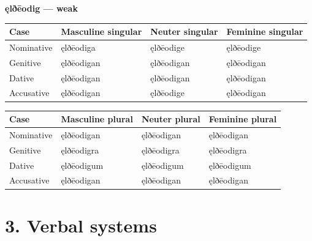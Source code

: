 \textbf{ęlðēodig — weak}

\par\begingroup
\fontsize{10.5}{13.2}\selectfont
\setlength{\LTleft}{0pt}\setlength{\LTright}{\fill}
\noindent
\begin{tabular}{@{}>{\raggedright\arraybackslash}p{22.0mm}>{\raggedright\arraybackslash}p{31.188mm}>{\raggedright\arraybackslash}p{31.188mm}>{\raggedright\arraybackslash}p{31.188mm}@{}}
\toprule
\textbf{Case} & \textbf{Masculine singular} & \textbf{Neuter singular} & \textbf{Feminine singular} \\
\midrule
Nominative & ęlðēodiga & ęlðēodige & ęlðēodige \\
Genitive & ęlðēodigan & ęlðēodigan & ęlðēodigan \\
Dative & ęlðēodigan & ęlðēodigan & ęlðēodigan \\
Accusative & ęlðēodigan & ęlðēodige & ęlðēodigan \\
\bottomrule
\end{tabular}
\par\endgroup
\par\addvspace{5pt}
\par\begingroup
\fontsize{10.5}{13.2}\selectfont
\setlength{\LTleft}{0pt}\setlength{\LTright}{\fill}
\noindent
\begin{tabular}{@{}>{\raggedright\arraybackslash}p{22.0mm}>{\raggedright\arraybackslash}p{31.188mm}>{\raggedright\arraybackslash}p{31.188mm}>{\raggedright\arraybackslash}p{31.188mm}@{}}
\toprule
\textbf{Case} & \textbf{Masculine plural} & \textbf{Neuter plural} & \textbf{Feminine plural} \\
\midrule
Nominative & ęlðēodigan & ęlðēodigan & ęlðēodigan \\
Genitive & ęlðēodigra & ęlðēodigra & ęlðēodigra \\
Dative & ęlðēodigum & ęlðēodigum & ęlðēodigum \\
Accusative & ęlðēodigan & ęlðēodigan & ęlðēodigan \\
\bottomrule
\end{tabular}
\par\endgroup

\section*{3. Verbal systems}

